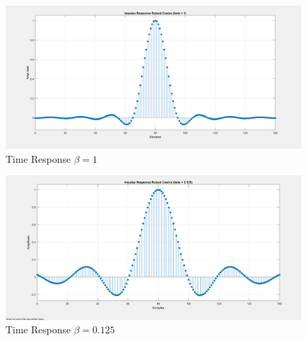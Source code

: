 \documentclass{article}
\begin{document}
\begin{figure}[h]
  \begin{center}
      \includegraphics[width=\linewidth]{img/impulse_response_beta_1.png}
      \caption{Time Response $\beta = 1$}
  \end{center}
\end{figure}
\begin{figure}[h]
  \begin{center}
      \includegraphics[width=\linewidth]{img/impulse_response_beta_125.png}
      \caption{Time Response $\beta = 0.125$}
  \end{center}
\end{figure}
\end{document}
